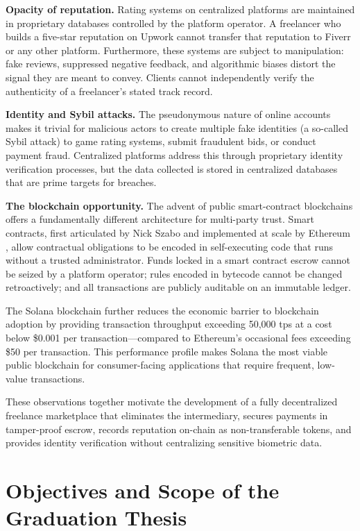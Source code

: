 \textbf{Opacity of reputation.} Rating systems on centralized platforms are maintained in proprietary databases controlled by the platform operator. A freelancer who builds a five-star reputation on Upwork cannot transfer that reputation to Fiverr or any other platform. Furthermore, these systems are subject to manipulation: fake reviews, suppressed negative feedback, and algorithmic biases distort the signal they are meant to convey. Clients cannot independently verify the authenticity of a freelancer's stated track record.

\textbf{Identity and Sybil attacks.} The pseudonymous nature of online accounts makes it trivial for malicious actors to create multiple fake identities (a so-called Sybil attack) to game rating systems, submit fraudulent bids, or conduct payment fraud. Centralized platforms address this through proprietary identity verification processes, but the data collected is stored in centralized databases that are prime targets for breaches.

\textbf{The blockchain opportunity.} The advent of public smart-contract blockchains offers a fundamentally different architecture for multi-party trust. Smart contracts, first articulated by Nick Szabo \cite{szabo1994smart} and implemented at scale by Ethereum \cite{buterin2014ethereum}, allow contractual obligations to be encoded in self-executing code that runs without a trusted administrator. Funds locked in a smart contract escrow cannot be seized by a platform operator; rules encoded in bytecode cannot be changed retroactively; and all transactions are publicly auditable on an immutable ledger.

The Solana blockchain \cite{yakovenko2018solana} further reduces the economic barrier to blockchain adoption by providing transaction throughput exceeding 50,000 \gls{tps} at a cost below \$0.001 per transaction---compared to Ethereum's occasional fees exceeding \$50 per transaction. This performance profile makes Solana the most viable public blockchain for consumer-facing applications that require frequent, low-value transactions.

These observations together motivate the development of a fully decentralized freelance marketplace that eliminates the intermediary, secures payments in tamper-proof escrow, records reputation on-chain as non-transferable tokens, and provides identity verification without centralizing sensitive biometric data.

\section{Objectives and Scope of the Graduation Thesis}
\label{section:1.2}

